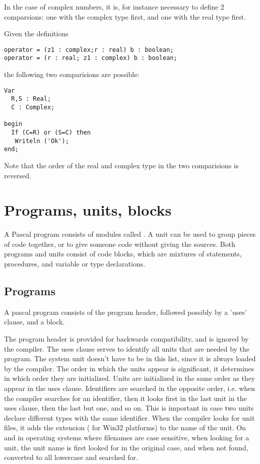 In the case of complex numbers, it is, for instance necessary to define
2 comparsions: one with the complex type first, and one with the real type
first.

Given the definitions
\begin{verbatim}
operator = (z1 : complex;r : real) b : boolean;
operator = (r : real; z1 : complex) b : boolean;
\end{verbatim}
the following two comparisions are possible:
\begin{verbatim}
Var
  R,S : Real;
  C : Complex;

begin
  If (C=R) or (S=C) then
   Writeln ('Ok');
end;
\end{verbatim}
Note that the order of the real and complex type in the two comparisions
is reversed.


\chapter{Programs, units, blocks}
A Pascal program consists of modules called . A unit can be used
to group pieces of code together, or to give someone code without giving
the sources.
Both programs and units consist of code blocks, which are mixtures of
statements, procedures, and variable or type declarations.

\section{Programs}
A pascal program consists of the program header, followed possibly by a
'uses' clause, and a block.

The program header is provided for backwards compatibility, and is ignored
by the compiler.
The uses clause serves to identify all units that are needed by the program.
The system unit doesn't have to be in this list, since it is always loaded
by the compiler.
The order in which the units appear is significant, it determines in
which order they are initialized. Units are initialized in the same order
as they appear in the uses clause. Identifiers are searched in the opposite
order, i.e. when the compiler searches for an identifier, then it looks
first in the last unit in the uses clause, then the last but one, and so on.
This is important in case two units declare different types with the same
identifier.
When the compiler looks for unit files, it adds the extension 
( for Win32 platforms) to the name of the unit. On \linux and in
operating systems where filenames are case sensitive,  when looking for a unit,
the unit name is first looked for in the original case, and when not found,
converted to all lowercase and searched for.

